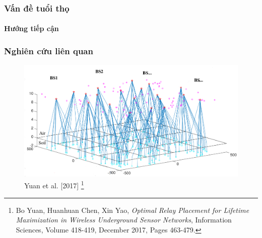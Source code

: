\begin{frame}
    \frametitle{Vấn đề tuổi thọ}
    \framesubtitle{Hướng tiếp cận}
        
    \begin{figure}
    \end{figure}
\end{frame}

\begin{frame}
    \frametitle{Nghiên cứu liên quan}
    \begin{figure}
        \includegraphics[width=0.85\linewidth]{picture/yuan2017.png}
        \caption{Yuan et al. [2017] \footnote{Bo Yuan, Huanhuan Chen, Xin Yao,
        \textit{Optimal Relay Placement for Lifetime Maximization in Wireless Underground Sensor Networks},
        Information Sciences, Volume 418-419, December 2017, Pages 463-479.}}
    \end{figure}
    
\end{frame}